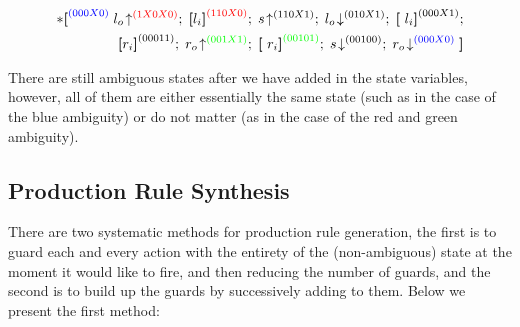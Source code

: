 \documentclass[times,10pt]{article}
\begin{document}

\begin{align*} 
*\textbf{[} ^{\color{blue}(000X0)} \;  l_o \! \uparrow^{\color{red}(1X0X0)}; \; \textbf{[}l_i\textbf{]}^{\color{red}(110X0)}; \; s\!\uparrow^{(110X1)}; \; l_o\!\downarrow^{(010X1)}; \; \textbf{[}~l_i\textbf{]}^{(000X1)}; \\
\textbf{[}r_i\textbf{]}^{(00011)}; \; r_o \! \uparrow^{\color{green}(001X1)}; \; \textbf{[}~r_i\textbf{]}^{\color{green}(00101)}; \; s\!\downarrow^{(00100)}; \; r_o \! \downarrow^{\color{blue}(000X0)}\textbf{]}
\end{align*}

There are still ambiguous states after we have added in the state variables, however, all of them are either essentially the same state (such as in the case of the blue ambiguity) or do not matter (as in the case of the red and green ambiguity).

\subsection{Production Rule Synthesis}

There are two systematic methods for production rule generation, the first is to guard each and every action with the entirety of the (non-ambiguous) state at the moment it would like to fire, and then reducing the number of guards, and the second is to build up the guards by successively adding to them.  Below we present the first method:
\end{document}
